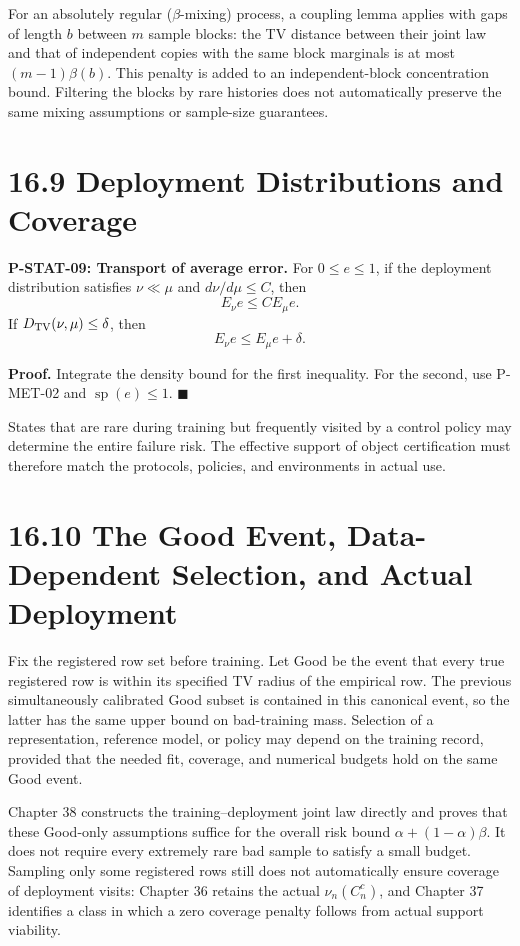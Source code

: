 \documentclass[
  english,
  11pt,
  oneside]{book}
\begin{document}
For an absolutely regular (\(\beta\)-mixing) process, a coupling lemma applies with gaps of length \(b\) between \(m\) sample blocks: the TV distance between their joint law and that of independent copies with the same block marginals is at most \((m-1)\beta(b)\). This penalty is added to an independent-block concentration bound. Filtering the blocks by rare histories does not automatically preserve the same mixing assumptions or sample-size guarantees.

\section{16.9 Deployment Distributions and Coverage}\label{deployment-distributions-and-coverage}

\hypertarget{p-stat-09}{}\label{p-stat-09}

\textbf{P-STAT-09: Transport of average error.} For \(0\le e\le1\), if the deployment distribution satisfies \(\nu\ll\mu\) and \(d\nu/d\mu\le C\), then \[E_\nu e\le C E_\mu e.\] If \(D_{\rm TV}(\nu,\mu)\le\delta\), then \[E_\nu e\le E_\mu e+\delta.\]

\textbf{Proof.} Integrate the density bound for the first inequality. For the second, use P-MET-02 and \(\operatorname{sp}(e)\le1\). \(\blacksquare\)

States that are rare during training but frequently visited by a control policy may determine the entire failure risk. The effective support of object certification must therefore match the protocols, policies, and environments in actual use.

\section{16.10 The Good Event, Data-Dependent Selection, and Actual Deployment}\label{the-good-event-data-dependent-selection-and-actual-deployment}

Fix the registered row set before training. Let Good be the event that every true registered row is within its specified TV radius of the empirical row. The previous simultaneously calibrated Good subset is contained in this canonical event, so the latter has the same upper bound on bad-training mass. Selection of a representation, reference model, or policy may depend on the training record, provided that the needed fit, coverage, and numerical budgets hold on the same Good event.

Chapter 38 constructs the training--deployment joint law directly and proves that these Good-only assumptions suffice for the overall risk bound \(\alpha+(1-\alpha)\beta\). It does not require every extremely rare bad sample to satisfy a small budget. Sampling only some registered rows still does not automatically ensure coverage of deployment visits: Chapter 36 retains the actual \(\nu_n(C_n^c)\), and Chapter 37 identifies a class in which a zero coverage penalty follows from actual support viability.
\end{document}
